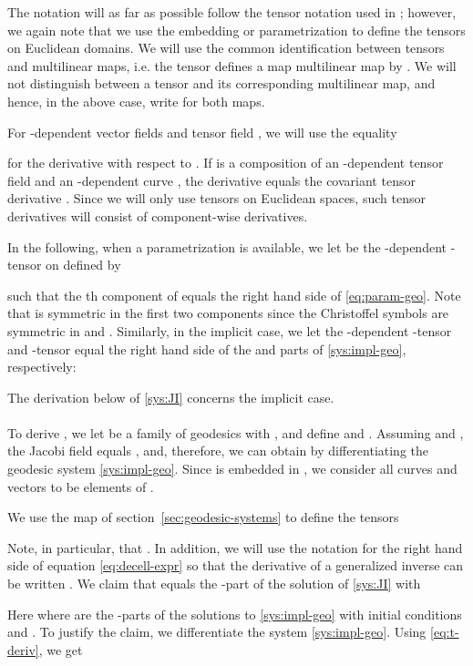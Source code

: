 \documentclass[final]{svjour3}
\begin{document}
The notation will as far as possible follow the tensor notation used in
\cite{do_carmo_riemannian_1992}; however, we again note that
we use the embedding or parametrization to define the tensors 
on Euclidean domains. We will use the common identification 
between tensors and multilinear maps, i.e.
the tensor  defines a map multilinear map
 by
. We will not
distinguish between a tensor and its corresponding multilinear map, and hence,
in the above case, write  for both maps. 

For -dependent vector fields  and tensor field ,
we will use the equality

for the derivative with respect to .
If  is a composition of an -dependent tensor field  and an
-dependent curve , the derivative  equals the
covariant tensor derivative  \cite[Chap.  4]{do_carmo_riemannian_1992}.
Since we will only use tensors on Euclidean spaces, such tensor derivatives 
will consist of component-wise derivatives.

In the following, when a parametrization  is available, we let  be the -dependent -tensor on
 defined by

such that the th component of 
equals the right hand side of \eqref{eq:param-geo}. Note that  is symmetric
in the first two components since the Christoffel symbols are symmetric in 
and . Similarly, in the implicit case, we let
the -dependent -tensor  and -tensor  equal the right hand side of the  and
 parts of \eqref{sys:impl-geo}, respectively:


The derivation below of \eqref{sys:JI} concerns the implicit case.
\\\ \\
    To derive , we let  be a family of geodesics with
    , and define
     and . Assuming  and ,
    the Jacobi field  equals , 
    and, therefore, we can obtain  by differentiating the 
    geodesic system \eqref{sys:impl-geo}. Since  is embedded in , we
    consider all curves and vectors to be elements of .

    We use the map  of section~\ref{sec:geodesic-systems}
    to define the tensors
    
    Note, in particular, that .
    In addition, we will use the
    notation  for the right hand side of equation
    \eqref{eq:decell-expr}
    so that the derivative of a generalized inverse can be written
    .
    We claim that  equals the -part of the solution of
    \eqref{sys:JI} with
    
    Here  where  are the -parts of the solutions to \eqref{sys:impl-geo} 
    with initial conditions  and . To justify the claim, we differentiate the system \eqref{sys:impl-geo}. 
    Using \eqref{eq:t-deriv}, we get
    
\end{document}
